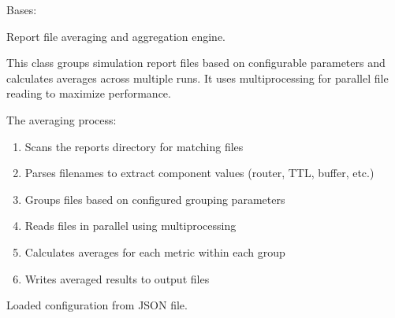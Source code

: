 \documentclass[a4paper,11pt,english,openany,oneside]{sphinxmanual}
\begin{document}

\begin{fulllineitems}
\label{\detokenize{modules/core:core.averager.ReportAverager}}
\pysigstartsignatures
\pysiglinewithargsret
{}
{\sphinxparamcomma {}}
{}
\pysigstopsignatures
\sphinxAtStartPar
Bases: 

\sphinxAtStartPar
Report file averaging and aggregation engine.

\sphinxAtStartPar
This class groups simulation report files based on configurable parameters
and calculates averages across multiple runs. It uses multiprocessing for
parallel file reading to maximize performance.

\sphinxAtStartPar
The averaging process:
\begin{enumerate}
%
\item {} 
\sphinxAtStartPar
Scans the reports directory for matching files

\item {} 
\sphinxAtStartPar
Parses filenames to extract component values (router, TTL, buffer, etc.)

\item {} 
\sphinxAtStartPar
Groups files based on configured grouping parameters

\item {} 
\sphinxAtStartPar
Reads files in parallel using multiprocessing

\item {} 
\sphinxAtStartPar
Calculates averages for each metric within each group

\item {} 
\sphinxAtStartPar
Writes averaged results to output files

\end{enumerate}

\begin{fulllineitems}
\label{\detokenize{modules/core:core.averager.ReportAverager.config}}
\pysigstartsignatures
\pysigline
{}
\pysigstopsignatures
\sphinxAtStartPar
Loaded configuration from JSON file.
\begin{quote}\begin{description}
\sphinxAtStartPar
{}


\end{description}
\end{quote}
\end{fulllineitems}
\end{fulllineitems}
\end{document}

